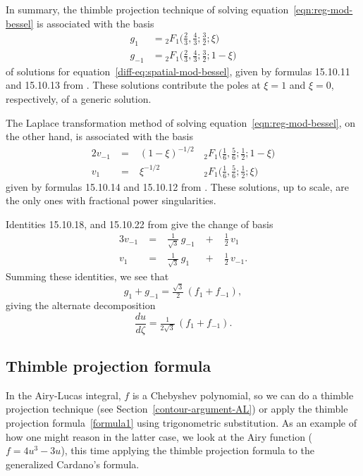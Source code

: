 \documentclass{article}
\theoremstyle{definition}
\begin{document}
In summary, the thimble projection technique of solving equation~\eqref{eqn:reg-mod-bessel} is associated with the basis
\begin{align*}
g_{1} & = {}_2F_1\big(\tfrac{2}{3}, \tfrac{4}{3}; \tfrac{3}{2}; \xi\big) \\
g_{-1} & = {}_2F_1\big(\tfrac{2}{3}, \tfrac{4}{3}; \tfrac{3}{2}; 1-\xi\big)
\end{align*}
of solutions for equation~\eqref{diff-eq:spatial-mod-bessel}, given by formulas 15.10.11 and 15.10.13 from \cite{dlmf}. These solutions contribute the poles at $\xi = 1$ and $\xi = 0$, respectively, of a generic solution.

The Laplace transformation method of solving equation~\eqref{eqn:reg-mod-bessel}, on the other hand, is associated with the basis
\begin{alignat*}{2}
v_{-1} &\;=\;& (1-\xi)^{-1/2} & \, {}_2F_1\big(\tfrac{1}{6}, \tfrac{5}{6}; \tfrac{1}{2}; 1-\xi\big) \\
v_1 &\;=\:& \xi^{-1/2} & \, {}_2F_1\big(\tfrac{1}{6}, \tfrac{5}{6}; \tfrac{1}{2}; \xi\big)
\end{alignat*}
given by formulas 15.10.14 and 15.10.12 from \cite{dlmf}. These solutions, up to scale, are the only ones with fractional power singularities.

Identities 15.10.18, and 15.10.22 from \cite{dlmf} give the change of basis
\begin{alignat*}{3}
v_{-1} &\;=\;&\tfrac{1}{\sqrt{3}}\,g_{-1} &\;+\;& \tfrac{1}{2}\,v_1 \\
v_1 &\;=\;& \tfrac{1}{\sqrt{3}}\,g_{1} &\;+\;& \tfrac{1}{2}\,v_{-1}.
\end{alignat*}
Summing these identities, we see that
\[ g_1 + g_{-1} = \tfrac{\sqrt{3}}{2}\,(f_1 + f_{-1}), \]
giving the alternate decomposition
\[ \frac{du}{d\zeta} = \tfrac{1}{2\sqrt{3}}\,(f_1 + f_{-1}). \]

\subsection{Thimble projection formula}

In the Airy-Lucas integral, $f$ is a Chebyshev polynomial, so we can do a thimble projection technique (see Section~\ref{contour-argument-AL}) or apply the thimble projection formula~\eqref{formula1} using trigonometric substitution. As an example of how one might reason in the latter case, we look at the Airy function ($f = 4u^3-3u$), this time applying the thimble projection formula to the generalized Cardano's formula.
\end{document}

